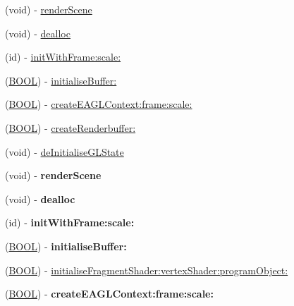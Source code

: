 \begin{DoxyCompactItemize}
\item 
(void) -\/ \hyperlink{interface_e_a_g_l_view_a6a34dc01b846b7e833492f073a8fe0d0}{render\+Scene}
\item 
(void) -\/ \hyperlink{interface_e_a_g_l_view_a018b2bd2e8c58c699e0c152ec311e6a2}{dealloc}
\item 
(id) -\/ \hyperlink{interface_e_a_g_l_view_a8b85dec5c17706949d171eace69ed647}{init\+With\+Frame\+:scale\+:}
\item 
(\hyperlink{_ice_types_8h_a050c65e107f0c828f856a231f4b4e788}{B\+O\+O\+L}) -\/ \hyperlink{interface_e_a_g_l_view_aa7779225db8378788af8e67b40a39766}{initialise\+Buffer\+:}
\item 
(\hyperlink{_ice_types_8h_a050c65e107f0c828f856a231f4b4e788}{B\+O\+O\+L}) -\/ \hyperlink{interface_e_a_g_l_view_a42e3f616047160bc03abf9cd54a7367e}{create\+E\+A\+G\+L\+Context\+:frame\+:scale\+:}
\item 
(\hyperlink{_ice_types_8h_a050c65e107f0c828f856a231f4b4e788}{B\+O\+O\+L}) -\/ \hyperlink{interface_e_a_g_l_view_a511be998ddda3a6c75bb67c3b21bb440}{create\+Renderbuffer\+:}
\item 
(void) -\/ \hyperlink{interface_e_a_g_l_view_a5a32476efbeef3241a173d115716b54e}{de\+Initialise\+G\+L\+State}
\item 
\hypertarget{interface_e_a_g_l_view_a6a34dc01b846b7e833492f073a8fe0d0}{(void) -\/ {\bfseries render\+Scene}}\label{interface_e_a_g_l_view_a6a34dc01b846b7e833492f073a8fe0d0}

\item 
\hypertarget{interface_e_a_g_l_view_a018b2bd2e8c58c699e0c152ec311e6a2}{(void) -\/ {\bfseries dealloc}}\label{interface_e_a_g_l_view_a018b2bd2e8c58c699e0c152ec311e6a2}

\item 
\hypertarget{interface_e_a_g_l_view_a8b85dec5c17706949d171eace69ed647}{(id) -\/ {\bfseries init\+With\+Frame\+:scale\+:}}\label{interface_e_a_g_l_view_a8b85dec5c17706949d171eace69ed647}

\item 
\hypertarget{interface_e_a_g_l_view_aa7779225db8378788af8e67b40a39766}{(\hyperlink{_ice_types_8h_a050c65e107f0c828f856a231f4b4e788}{B\+O\+O\+L}) -\/ {\bfseries initialise\+Buffer\+:}}\label{interface_e_a_g_l_view_aa7779225db8378788af8e67b40a39766}

\item 
(\hyperlink{_ice_types_8h_a050c65e107f0c828f856a231f4b4e788}{B\+O\+O\+L}) -\/ \hyperlink{interface_e_a_g_l_view_add25e50a783df6ffdf06bda1b353465f}{initialise\+Fragment\+Shader\+:vertex\+Shader\+:program\+Object\+:}
\item 
\hypertarget{interface_e_a_g_l_view_a42e3f616047160bc03abf9cd54a7367e}{(\hyperlink{_ice_types_8h_a050c65e107f0c828f856a231f4b4e788}{B\+O\+O\+L}) -\/ {\bfseries create\+E\+A\+G\+L\+Context\+:frame\+:scale\+:}}\label{interface_e_a_g_l_view_a42e3f616047160bc03abf9cd54a7367e}


\end{DoxyCompactItemize}
